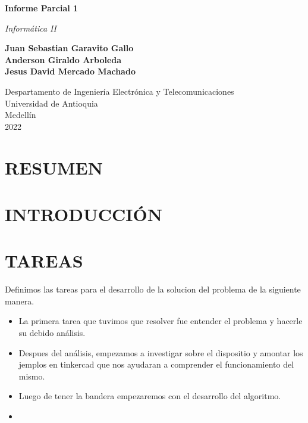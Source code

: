 \documentclass{article}
\begin{document}
\begin{titlepage}
    \begin{center}
        \vspace*{1cm}
        
        \Huge
        \textbf{Informe Parcial 1}
            
        \vspace{0.5cm}
        \LARGE
       \textit{ Informática II}
            
        \vspace{1.5cm}
            
        \textbf{Juan Sebastian Garavito Gallo\\
        Anderson Giraldo Arboleda\\
        Jesus David Mercado Machado}
            
        \vfill
            
        \vspace{0.8cm}
            
        \Large
        Despartamento de Ingeniería Electrónica y Telecomunicaciones\\
        Universidad de Antioquia\\
        Medellín\\
        2022
            
    \end{center}
\end{titlepage}

\tableofcontents
\newpage

\section{RESUMEN}
\label{resumen}




\newpage
\section{INTRODUCCIÓN}

\newpage
\section{TAREAS}
\label{tareas}
Definimos las tareas para el desarrollo de la solucion del problema de la siguiente manera.

\begin{itemize}

    \item La primera tarea que tuvimos que resolver fue entender el problema y hacerle su debido análisis.
    
    \item Despues del análisis, empezamos a investigar sobre el dispositio y amontar los jemplos en tinkercad que nos ayudaran a comprender el funcionamiento del mismo.
    
    \item Luego de tener la bandera empezaremos con el desarrollo del algoritmo.
    
    \item 
    
   
    
\end{itemize}
\end{document}
